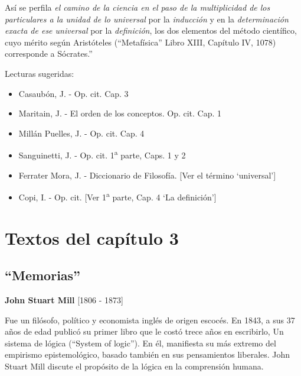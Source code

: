 \documentclass{article}
\begin{document}
    \setlength{\leftskip}{0em}
    Así se perfila \emph{el camino de la ciencia en el paso de la multiplicidad de los particulares a la unidad de lo universal} por la \emph{inducción} y en la \emph{determinación exacta de ese universal} por la \emph{definición}, los dos elementos del método científico, cuyo mérito según Aristóteles (``Metafísica'' Libro XIII, Capítulo IV, 1078) corresponde a Sócrates.'' \par
    
\vspace*{\fill}
    
\noindent Lecturas sugeridas:
\begin{itemize}[label={$\bullet$}]
    \item Casaubón, J. - Op. cit. Cap. 3
    \item Maritain, J. - El orden de los conceptos. Op. cit. Cap. 1
    \item Millán Puelles, J. - Op. cit. Cap. 4
    \item Sanguinetti, J. - Op. cit. 1\textsuperscript{a} parte, Caps. 1 y 2
    \item Ferrater Mora, J. - Diccionario de Filosofía. [Ver el término `universal']
    \item Copi, I. - Op. cit. [Ver 1\textsuperscript{a} parte, Cap. 4 `La definición']
\end{itemize}
    
\newpage
    
\section{Textos del capítulo 3}

\subsection{``Memorias''}

\begin{center}
    \large{\textbf{John Stuart Mill} [1806 - 1873]} 
\end{center}
    Fue un filósofo, político y economista inglés de origen escocés. En 1843, a sus 37 años de edad publicó su primer libro que le costó trece años en escribirlo, Un sistema de lógica (``System of logic''). En él, manifiesta su más extremo del empirismo epistemológico, basado también en sus pensamientos liberales. John Stuart Mill discute el propósito de la lógica en la comprensión humana. \par 
\end{document}
